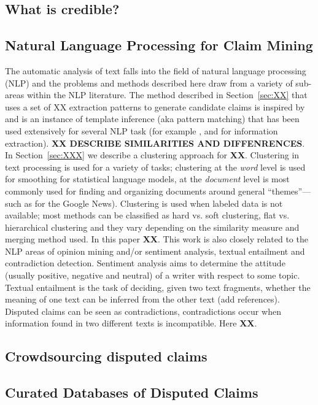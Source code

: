 \subsection{What is credible?}



\subsection{Natural Language Processing for Claim Mining}

The automatic analysis of text falls into the field of natural language processing (NLP) and the problems and methods described here draw from a variety of sub-areas within the NLP literature. The method described in Section~\ref{sec:XX} that uses a set of XX extraction patterns to generate candidate claims  is inspired by \cite{hearst92} and is an instance of template inference (aka pattern matching) that has been used extensively for several NLP task (for example \cite{Riloff93}, \cite{Jones99} and \cite{etzioni05} for information extraction). {\bf XX DESCRIBE SIMILARITIES AND DIFFENRENCES}. In Section~\ref{sec:XXX} we describe a clustering approach for {\bf XX}. Clustering in text processing is used for a variety  of tasks; clustering at the {\em word} level is used for smoothing for statistical language models, at the {\em document} level is most commonly used for finding and organizing documents around  general “themes”—such as for the Google News). Clustering is used when labeled data is not available; most methods can be classified as hard vs. soft clustering, flat vs. hierarchical clustering and they vary depending on the similarity measure and merging method used. In this paper {\bf XX}. This work is also closely related to the NLP areas of opinion mining and/or sentiment analysis, textual entailment and contradiction detection. Sentiment analysis aims to determine the attitude (usually positive, negative and neutral) of a writer with respect to some topic\cite{pangLee}. Textual entailment is the task of deciding, given two text fragments, whether the meaning of one text can be inferred from the other text (add references). Disputed claims can be seen as contradictions, contradictions occur when information found in two different texts is incompatible\cite{harabagiu}. Here {\bf XX}.



\subsection{Crowdsourcing disputed claims}


\subsection{Curated Databases of Disputed Claims}

